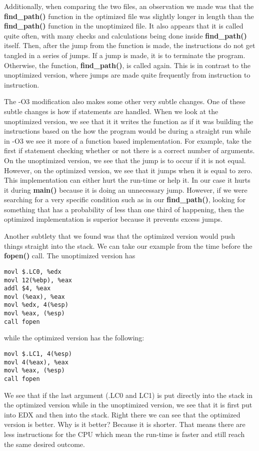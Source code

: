 \documentclass[12pt,letterpaper]{article}
\begin{document}
Additionally, when comparing the two files, an observation we made 
was that the {\bf find\_path()} function in the optimized file was 
slightly longer in length than the {\bf find\_path()} function in the 
unoptimized file. It also appears that it is called quite often, with 
many checks and calculations being done inside {\bf find\_path()} itself. 
Then, after the jump from the function is made, the instructions do 
not get tangled in a series of jumps. If a jump is made, it is to 
terminate the program. Otherwise, the function, {\bf find\_path()}, is 
called again. This is in contrast to the unoptimized version, where 
jumps are made quite frequently from instruction to instruction.
        
The -O3 modification also makes some other very subtle changes. One of 
these subtle changes is how if statements are handled. When we look 
at the unoptimized version, we see that it it writes the function as if 
it was building the instructions based on the how the program would be 
during a straight run while in -O3 we see it more of a function based 
implementation. For example, take the first if statement checking 
whether or not there is a correct number of arguments. On the 
unoptimized version, we see that the jump is to occur if it is 
not equal. However, on the optimized version, we see that it jumps when 
it is equal to zero. This implementation can either hurt the run-time 
or help it. In our case it hurts it during {\bf main()} because it is 
doing an unnecessary jump. However, if we were searching for a very 
specific condition such as in our {\bf find\_path()}, looking for 
something that has a probability of less than one third of happening, 
then the optimized implementation is superior because it prevents excess jumps.

Another subtlety that we found was that the optimized version would push 
things straight into the stack. We can take our example from the time 
before the {\bf fopen()} call. The unoptimized version has
\begin{verbatim}
movl $.LC0, %edx
movl 12(%ebp), %eax
addl $4, %eax
movl (%eax), %eax
movl %edx, 4(%esp)
movl %eax, (%esp)
call fopen
\end{verbatim}
while the optimized version has the following:
\begin{verbatim}
movl $.LC1, 4(%esp)
movl 4(%eax), %eax
movl %eax, (%esp)
call fopen
\end{verbatim}
We see that if the last argument (.LC0 and LC1) is put directly into 
the stack in the optimized version while in the unoptimized version, 
we see that it is first put into EDX and then into the stack. Right 
there we can see that the optimized version is better. Why is it better? 
Because it is shorter. That means there are less instructions for 
the CPU which mean the run-time is faster and still reach the 
same desired outcome.
\end{document}
